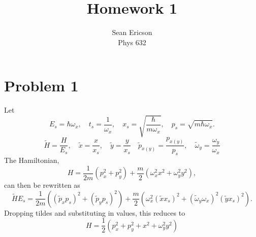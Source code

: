 \documentclass[12pt]{article}
\begin{document}
	
\title{Homework 1}
\author{Sean Ericson \\ Phys 632}
\maketitle

\section*{Problem 1}
Let 
\[ E_s = \hbar\omega_x, \quad t_s = \frac{1}{\omega_x}, \quad x_s = \sqrt{\frac{\hbar}{m\omega_x}}, \quad p_s = \sqrt{m\hbar\omega_x}. \]
\[ \tilde{H} = \frac{H}{E_s}, \quad \tilde{x} = \frac{x}{x_s}, \quad \tilde{y} = \frac{y}{x_s} \quad \tilde{p}_{x(y)} = \frac{p_{x(y)}}{p_s}, \quad \tilde{\omega}_y = \frac{\omega_y}{\omega_x} \]
The Hamiltonian,
\[ H = \frac{1}{2m}\left(p_x^2 + p_y^2\right) + \frac{m}{2}\left(\omega_x^2x^2 + \omega_y^2y^2\right), \]
can then be rewritten as
\[ \tilde{H}E_s = \frac{1}{2m}\left((\tilde{p}_xp_s)^2 + (\tilde{p}_yp_s)^2\right) + \frac{m}{2}\left(\omega_x^2(\tilde{x}x_s)^2 + (\tilde{\omega}_y\omega_x)^2(\tilde{y}x_s)^2\right). \] 
Dropping tildes and substituting in values, this reduces to
\[ H = \frac{1}{2}\left(p_x^2 + p_y^2 + x^2 + \omega_y^2y^2\right) \]
\end{document}

